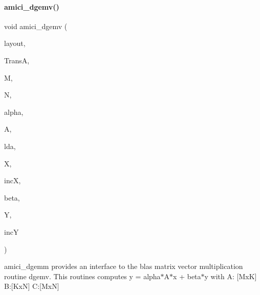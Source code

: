 \paragraph{\texorpdfstring{amici\+\_\+dgemv()}{amici\_dgemv()}}
{\footnotesize\ttfamily void amici\+\_\+dgemv (\begin{DoxyParamCaption}\item[{\mbox{\hyperlink{namespaceamici_a3ec6460bb4e7f6100a15d18627a3ff3e}{B\+L\+A\+S\+Layout}}}]{layout,  }\item[{\mbox{\hyperlink{namespaceamici_a0f0ec77c6c8f48d9c5cb50d54899afae}{B\+L\+A\+S\+Transpose}}}]{TransA,  }\item[{const int}]{M,  }\item[{const int}]{N,  }\item[{const double}]{alpha,  }\item[{const double $\ast$}]{A,  }\item[{const int}]{lda,  }\item[{const double $\ast$}]{X,  }\item[{const int}]{incX,  }\item[{const double}]{beta,  }\item[{double $\ast$}]{Y,  }\item[{const int}]{incY }\end{DoxyParamCaption})}

amici\+\_\+dgemm provides an interface to the blas matrix vector multiplication routine dgemv. This routines computes y = alpha$\ast$\+A$\ast$x + beta$\ast$y with A\+: \mbox{[}MxK\mbox{]} B\+:\mbox{[}KxN\mbox{]} C\+:\mbox{[}MxN\mbox{]}


